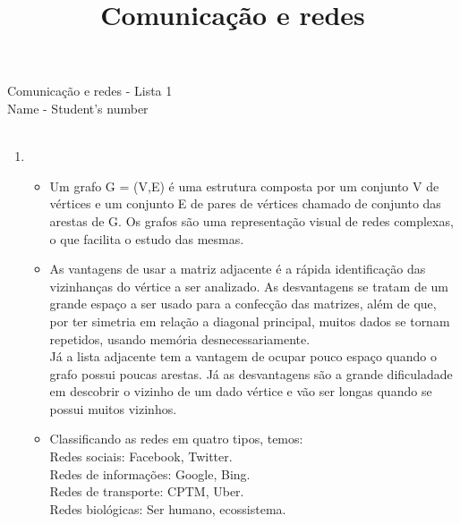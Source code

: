\documentclass[11pt,reqno]{amsart}
\title{Comunicação e redes}
\author{}
\date{}
\begin{document}
\begin{center}
Comunicação e redes - Lista 1\\ 
Name - Student's number \\ \ \\
\end{center}



\begin{enumerate}

\item

\begin{itemize}
	\item Um grafo G = (V,E) é uma estrutura composta por um conjunto V de vértices e um conjunto E de pares de vértices chamado de conjunto das arestas de G. Os grafos são uma representação visual de redes complexas, o que facilita o estudo das mesmas.
	\item As vantagens de usar a matriz adjacente é a rápida identificação das vizinhanças do vértice a ser analizado. As desvantagens se tratam de um grande espaço a ser usado para a confecção das matrizes, além de que, por ter simetria em relação a diagonal principal, muitos dados se tornam repetidos, usando memória desnecessariamente. \\ Já a lista adjacente tem a vantagem de ocupar pouco espaço quando o grafo possui poucas arestas. Já as desvantagens são a grande dificuladade em descobrir o vizinho de um dado vértice e vão ser longas quando se possui muitos vizinhos.
	\item Classificando as redes em quatro tipos, temos: \\ Redes sociais: Facebook, Twitter. \\ Redes de informações: Google, Bing. \\ Redes de transporte: CPTM, Uber. \\ Redes biológicas: Ser humano, ecossistema. 
\end{itemize}
\vspace{0.3cm}



\end{enumerate}
\end{document}

